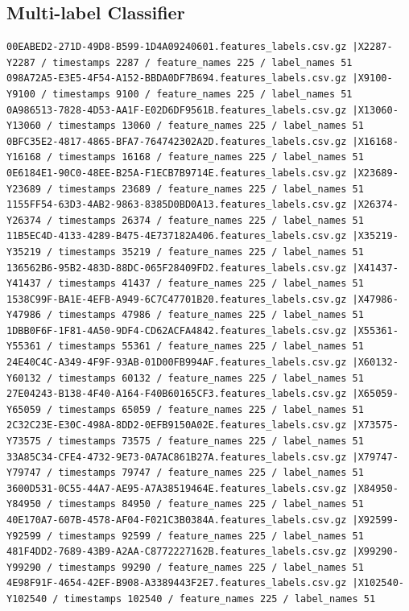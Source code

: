 \documentclass{UoNMCHA}
\numberwithin{equation}{section}
\begin{document}
\subsection{Multi-label Classifier}
\begin{lstlisting}[breaklines=true]
00EABED2-271D-49D8-B599-1D4A09240601.features_labels.csv.gz |X2287-Y2287 / timestamps 2287 / feature_names 225 / label_names 51
098A72A5-E3E5-4F54-A152-BBDA0DF7B694.features_labels.csv.gz |X9100-Y9100 / timestamps 9100 / feature_names 225 / label_names 51
0A986513-7828-4D53-AA1F-E02D6DF9561B.features_labels.csv.gz |X13060-Y13060 / timestamps 13060 / feature_names 225 / label_names 51
0BFC35E2-4817-4865-BFA7-764742302A2D.features_labels.csv.gz |X16168-Y16168 / timestamps 16168 / feature_names 225 / label_names 51
0E6184E1-90C0-48EE-B25A-F1ECB7B9714E.features_labels.csv.gz |X23689-Y23689 / timestamps 23689 / feature_names 225 / label_names 51
1155FF54-63D3-4AB2-9863-8385D0BD0A13.features_labels.csv.gz |X26374-Y26374 / timestamps 26374 / feature_names 225 / label_names 51
11B5EC4D-4133-4289-B475-4E737182A406.features_labels.csv.gz |X35219-Y35219 / timestamps 35219 / feature_names 225 / label_names 51
136562B6-95B2-483D-88DC-065F28409FD2.features_labels.csv.gz |X41437-Y41437 / timestamps 41437 / feature_names 225 / label_names 51
1538C99F-BA1E-4EFB-A949-6C7C47701B20.features_labels.csv.gz |X47986-Y47986 / timestamps 47986 / feature_names 225 / label_names 51
1DBB0F6F-1F81-4A50-9DF4-CD62ACFA4842.features_labels.csv.gz |X55361-Y55361 / timestamps 55361 / feature_names 225 / label_names 51
24E40C4C-A349-4F9F-93AB-01D00FB994AF.features_labels.csv.gz |X60132-Y60132 / timestamps 60132 / feature_names 225 / label_names 51
27E04243-B138-4F40-A164-F40B60165CF3.features_labels.csv.gz |X65059-Y65059 / timestamps 65059 / feature_names 225 / label_names 51
2C32C23E-E30C-498A-8DD2-0EFB9150A02E.features_labels.csv.gz |X73575-Y73575 / timestamps 73575 / feature_names 225 / label_names 51
33A85C34-CFE4-4732-9E73-0A7AC861B27A.features_labels.csv.gz |X79747-Y79747 / timestamps 79747 / feature_names 225 / label_names 51
3600D531-0C55-44A7-AE95-A7A38519464E.features_labels.csv.gz |X84950-Y84950 / timestamps 84950 / feature_names 225 / label_names 51
40E170A7-607B-4578-AF04-F021C3B0384A.features_labels.csv.gz |X92599-Y92599 / timestamps 92599 / feature_names 225 / label_names 51
481F4DD2-7689-43B9-A2AA-C8772227162B.features_labels.csv.gz |X99290-Y99290 / timestamps 99290 / feature_names 225 / label_names 51
4E98F91F-4654-42EF-B908-A3389443F2E7.features_labels.csv.gz |X102540-Y102540 / timestamps 102540 / feature_names 225 / label_names 51

\end{lstlisting}
\end{document}
